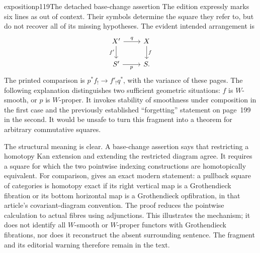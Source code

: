 \begin{dcomment}{exposition}{p119}{The detached base-change assertion}
The edition expressly marks six lines as out of context. Their symbols determine the square they refer to, but do not recover all of its missing hypotheses. The evident intended arrangement is
\[
\begin{tikzcd}
 X' \arrow[r,"q"] \arrow[d,"f'"'] & X \arrow[d,"f"]\\
 S' \arrow[r,"p"'] & S.
\end{tikzcd}
\]
The printed comparison is $p^*f_!\to f'_!q^*$, with the variance of these pages. The following explanation distinguishes two sufficient geometric situations: $f$ is $W$-smooth, or $p$ is $W$-proper. It invokes stability of smoothness under composition in the first case and the previously established ``forgetting'' statement on page~199 in the second. It would be unsafe to turn this fragment into a theorem for arbitrary commutative squares.

The structural meaning is clear. A base-change assertion says that restricting a homotopy Kan extension and extending the restricted diagram agree. It requires a square for which the two pointwise indexing constructions are homotopically equivalent. For comparison, \citet[Proposition~1.24]{Groth2013} gives an exact modern statement: a pullback square of categories is homotopy exact if its right vertical map is a Grothendieck fibration or its bottom horizontal map is a Grothendieck opfibration, in that article's covariant-diagram convention. The proof reduces the pointwise calculation to actual fibres using adjunctions. This illustrates the mechanism; it does not identify all $W$-smooth or $W$-proper functors with Grothendieck fibrations, nor does it reconstruct the absent surrounding sentence. The fragment and its editorial warning therefore remain in the text.
\end{dcomment}

